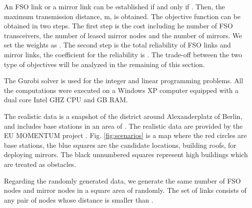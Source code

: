 \documentclass[onecolumn,11pt,draftclsnofoot]{IEEEtran}
\begin{document}
An FSO link or a mirror link can be established if and only if . Then, the maximum transmission distance,  m, is obtained. The objective function can be obtained in two steps. The first step is the cost including he number of FSO transceivers, the number of leased mirror nodes and the number of mirrors. We set the weights as . The second step is the total reliability of FSO links and mirror links, the coefficient for the reliability is . The trade-off between the two type of objectives will be analyzed in the remaining of this section.

The Gurobi solver \cite{Gurobi} is used for the integer and linear programming problems. All the computations were executed on a Windows XP computer equipped with a dual core Intel  GHZ CPU and GB RAM.

The realistic data is a snapshot of the district around Alexanderplatz of Berlin, and includes  base stations in an area of . The realistic data are provided by the EU MOMENTUM project \cite{MOMENTUM}. Fig. \ref{fig:scenarios} is a map where the red circles are base stations, the blue squares are the candidate locations, building roofs, for deploying mirrors. The black unnumbered squares represent high buildings which are treated as obstacles.

Regarding the randomly generated data, we generate the same number of FSO nodes and mirror nodes in a square area of  randomly. The set of links consists of any pair of nodes whose distance is smaller than .
\end{document}
